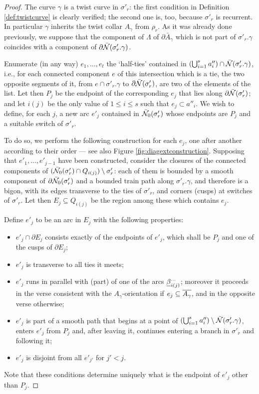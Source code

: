 \begin{proof}
The curve $\gamma$ is a twist curve in $\sigma'_r$: the first condition in Definition \ref{def:twistcurve} is clearly verified; the second one is, too, because $\sigma'_r$ is recurrent. In particular $\gamma$ inherits the twist collar $A_\gamma$ from $\rho_r$. As it was already done previously, we suppose that the component of $\Lambda$ of $\partial\bar A_\gamma$ which is not part of $\sigma'_r.\gamma$ coincides with a component of $\partial\bar{{\mathcal N}}(\sigma'_r.\gamma)$.

Enumerate (in any way) $e_1,\ldots,e_t$ the `half-ties' contained in $\left(\bigcup_{i=1}^s a''_i\right)\cap\bar{{\mathcal N}}(\sigma'_r.\gamma)$, i.e., for each connected component $e$ of this intersection which is a tie, the two opposite segments of it, from $e\cap\sigma'_r.\gamma$ to $\partial\bar{{\mathcal N}}(\sigma'_r)$, are two of the elements of the list. Let then $P_j$ be the endpoint of the corresponding $e_j$ that lies along $\partial\bar{{\mathcal N}}(\sigma'_r)$; and let $i(j)$ be the only value of $1\leq i\leq s$ such that $e_j\subset a''_i$. We wish to define, for each $j$, a new arc $e'_j$ contained in $\bar{{\mathcal N}}_0(\sigma'_r)$ whose endpoints are $P_j$ and a suitable switch of $\sigma'_r$. 

To do so, we perform the following construction for each $e_j$, one after another according to their order --- see also Figure \ref{fig:diagextconstruction}. Supposing that $e'_1,\ldots,e'_{j-1}$ have been constructed, consider the closures of the connected components of $(\bar{{\mathcal N}}_0(\sigma'_r)\cap Q_{i(j)})\setminus\sigma'_r$: each of them is bounded by a smooth component of $\partial\bar{{\mathcal N}}_0(\sigma'_r)$ and a bounded train path along $\sigma'_r.\gamma$, and therefore is a bigon, with its edges transverse to the ties of $\sigma'_r$, and corners (cusps) at switches of $\sigma'_r$. Let then $E_j\subseteq Q_{i(j)}$ be the region among these which contains $e_j$.

Define $e'_j$ to be an arc in $E_j$ with the following properties:
\begin{itemize}
\item $e'_j\cap\partial E_j$ consists exactly of the endpoints of $e'_j$, which shall be $P_j$ and one of the cusps of $\partial E_j$;
\item $e'_j$ is transverse to all ties it meets;
\item $e'_j$ runs in parallel with (part) of one of the arcs $\underline{\beta}_{i(j)}^{\ldots}$; moreover it proceeds in the verse consistent with the $A_\gamma$-orientation if $e_j\subseteq \overline{A_\gamma}$, and in the opposite verse otherwise;
\item $e'_j$ is part of a smooth path that begins at a point of $\left(\bigcup_{i=1}^s a''_i\right)\setminus \bar{{\mathcal N}}(\sigma'_r.\gamma)$, enters $e'_j$ from $P_j$ and, after leaving it, continues entering a branch in $\sigma'_r$ and following it;
\item $e'_j$ is disjoint from all $e'_{j'}$ for $j'<j$.
\end{itemize}
Note that these conditions determine uniquely what is the endpoint of $e'_j$ other than $P_j$.


\end{proof}
